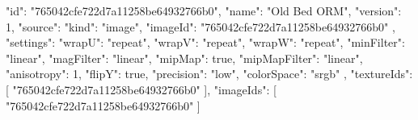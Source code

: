 {
  "id": "765042cfe722d7a11258be64932766b0",
  "name": "Old Bed ORM",
  "version": 1,
  "source": {
    "kind": "image",
    "imageId": "765042cfe722d7a11258be64932766b0"
  },
  "settings": {
    "wrapU": "repeat",
    "wrapV": "repeat",
    "wrapW": "repeat",
    "minFilter": "linear",
    "magFilter": "linear",
    "mipMap": true,
    "mipMapFilter": "linear",
    "anisotropy": 1,
    "flipY": true,
    "precision": "low",
    "colorSpace": "srgb"
  },
  "textureIds": [
    "765042cfe722d7a11258be64932766b0"
  ],
  "imageIds": [
    "765042cfe722d7a11258be64932766b0"
  ]
}

